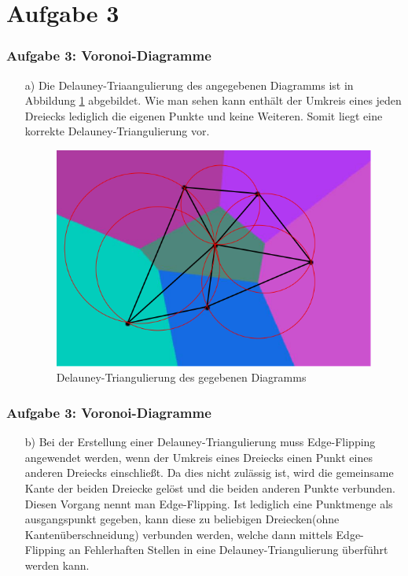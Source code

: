\documentclass[accentcolor=tud9c,colorbacktitle,inverttitle,landscape,german,presentation,t]{tudbeamer}
\begin{document}
\section{Aufgabe 3}
\begin{frame}
	\frametitle{Aufgabe 3: Voronoi-Diagramme}
	\begin{itemize}
	\item[a)]
	Die Delauney-Triaangulierung des angegebenen Diagramms ist in Abbildung \ref{DelTri} abgebildet. Wie man sehen kann enthält der Umkreis eines jeden Dreiecks lediglich die eigenen Punkte und keine Weiteren. Somit liegt eine korrekte Delauney-Triangulierung vor.
	\begin{figure}
		\includegraphics[width = .5\linewidth]{task_3a.png}
		\caption{Delauney-Triangulierung des gegebenen Diagramms}
		\label{DelTri}
	\end{figure}
	\end{itemize} 
\end{frame}
\begin{frame}
	\frametitle{Aufgabe 3: Voronoi-Diagramme}
	\begin{itemize}
	\item[b)]
	Bei der Erstellung einer Delauney-Triangulierung muss Edge-Flipping angewendet werden, wenn der Umkreis eines Dreiecks einen Punkt eines anderen Dreiecks einschließt. Da dies nicht zulässig ist, wird die gemeinsame Kante der beiden Dreiecke gelöst und die beiden anderen Punkte verbunden. Diesen Vorgang nennt man Edge-Flipping. Ist lediglich eine Punktmenge als ausgangspunkt gegeben, kann diese zu beliebigen Dreiecken(ohne Kantenüberschneidung)  verbunden werden, welche dann mittels Edge-Flipping an Fehlerhaften Stellen in eine Delauney-Triangulierung überführt werden kann. 
	\end{itemize} 
\end{frame}
\end{document}
